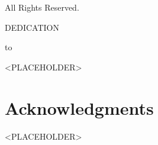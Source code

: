 \documentclass[12pt,parskip=full]{report}
\theoremstyle{plain}
\theoremstyle{definition}
\begin{document}
{{\begin{center}
All Rights Reserved.
\end{center}
}

\setcounter{page}{3}
\newpage
{\singlespacing
\begin{center}
{
\par
\vspace{1.2in}
DEDICATION
\par
\vspace{0.57in}
to
\par
\vspace{1.2in}
<PLACEHOLDER>
	\par
	\vspace{0.17in}
	\par
	\vspace{0.17in}
	\par
	\vspace{0.17in}
	\par
	\vspace{0.17in}
	\par
	\vspace{1.2in}
%
\par
\vspace{0.17in}
%
\par
\vfill
}
\end{center}
}


\newpage

\chapter*{Acknowledgments} %

<PLACEHOLDER>

}
\end{document}
